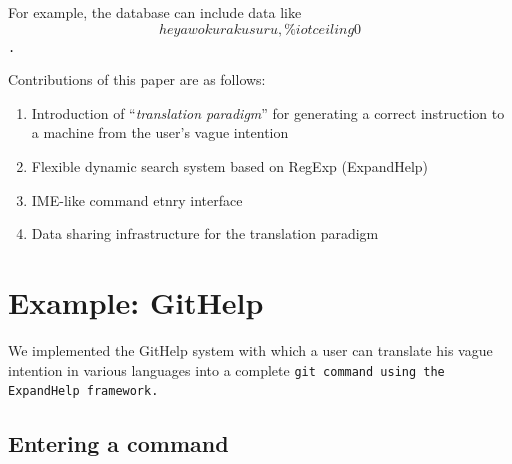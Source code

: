 \documentclass{sigchi}
\def\GH{\textsf{GitHelp}}
\def\EH{\textsf{ExpandHelp}}
\begin{document}
For example, the database can include data like
\tt{\[ heya wo kuraku suru, \% iot ceiling 0 \]}.


Contributions of this paper are as follows:

\begin{enumerate}
\item Introduction of ``\textit{translation paradigm}'' for
  generating a correct instruction to a machine from
  the user's vague intention
\item Flexible dynamic search system based on RegExp (ExpandHelp)
\item IME-like command etnry interface
\item Data sharing infrastructure for the translation paradigm
\end{enumerate}

\section{Example: GitHelp}

We implemented the {\GH} system
with which a user can translate his vague intention in various languages
into a complete \tt{git} command
using the {\EH} framework.

\subsection{Entering a command}
\end{document}
